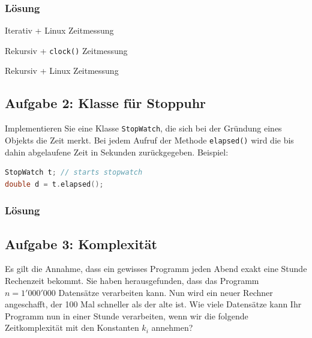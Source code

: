 \subsubsection{Lösung}

\large{Iterativ + Linux Zeitmessung}


\large{Rekursiv + \texttt{clock()} Zeitmessung}


\large{Rekursiv + Linux Zeitmessung}


\subsection{Aufgabe 2: Klasse für Stoppuhr}
Implementieren Sie eine Klasse \texttt{StopWatch}, die sich bei der Gründung eines Objekts die Zeit merkt. Bei
jedem Aufruf der Methode \texttt{elapsed()} wird die bis dahin abgelaufene Zeit in Sekunden zurückgegeben.
Beispiel:

\begin{lstlisting}[language=C++, style=C++]
StopWatch t; // starts stopwatch
double d = t.elapsed();
\end{lstlisting}

\subsubsection{Lösung}


\noindent\makebox[\linewidth]{\rule{\paperwidth}{0.4pt}}

\noindent\makebox[\linewidth]{\rule{\paperwidth}{0.4pt}}


\subsection{Aufgabe 3: Komplexität}

Es gilt die Annahme, dass ein gewisses Programm jeden Abend exakt eine Stunde Rechenzeit bekommt.
Sie haben herausgefunden, dass das Programm $n=1'000'000$ Datensätze verarbeiten kann. Nun wird ein
neuer Rechner angeschafft, der 100 Mal schneller als der alte ist.
Wie viele Datensätze kann Ihr Programm nun in einer Stunde verarbeiten, wenn wir die folgende Zeitkomplexität
mit den Konstanten $k_i$ annehmen?

